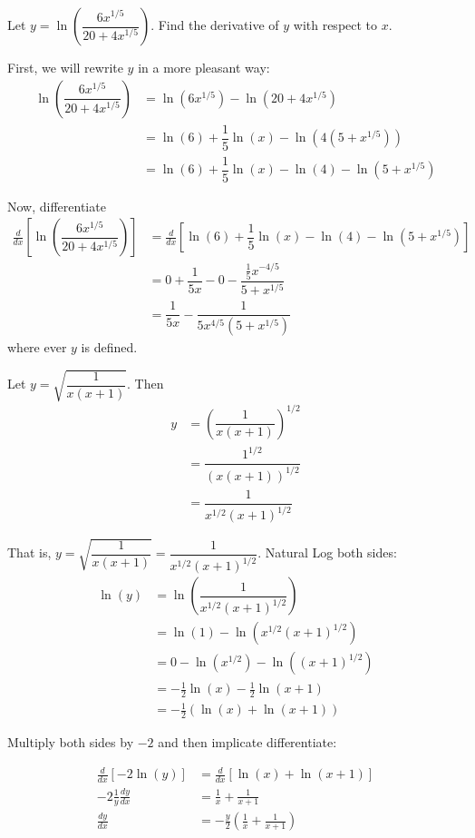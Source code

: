 \documentclass{article}
\newcommand{\ddx}[1]{\frac{d}{dx}\left[#1\right]}
\newcommand{\dydx}{\frac{dy}{dx}}
\newcommand{\newp}{\hrulefill \vskip 1cm}
\begin{document}
Let $y=\ln\left(\dfrac{6x^{1/5}}{20+4x^{1/5}}\right)$. Find the derivative
of $y$ with respect to $x$.

First, we will rewrite $y$ in a more pleasant way:
\[
\begin{aligned}\ln\left(\dfrac{6x^{1/5}}{20+4x^{1/5}}\right) & =\ln(6x^{1/5})-\ln(20+4x^{1/5})\\
 & =\ln(6)+\dfrac{1}{5}\ln(x)-\ln(4(5+x^{1/5}))\\
 & =\ln(6)+\dfrac{1}{5}\ln(x)-\ln(4)-\ln(5+x^{1/5})
\end{aligned}
\]

Now, differentiate
\[
\begin{aligned}\frac{d}{dx}\left[\ln\left(\dfrac{6x^{1/5}}{20+4x^{1/5}}\right)\right] & =\frac{d}{dx}\left[\ln(6)+\dfrac{1}{5}\ln(x)-\ln(4)-\ln(5+x^{1/5})\right]\\
 & =0+\dfrac{1}{5x}-0-\dfrac{\frac{1}{5}x^{-4/5}}{5+x^{1/5}}\\
 & =\dfrac{1}{5x}-\dfrac{1}{5x^{4/5}\left(5+x^{1/5}\right)}
\end{aligned}
\]
where ever $y$ is defined.

\newp

Let $y=\sqrt{\dfrac{1}{x(x+1)}}$. Then
\[
\begin{aligned}
    y&=\left( \dfrac{1}{x(x+1)} \right)^{1/2}\\
    &= \dfrac{1^{1/2}}{\left( x(x+1) \right)^{1/2}}\\
    &= \dfrac{1}{x^{1/2}(x+1)^{1/2}}
\end{aligned}
\]

That is, $y=\sqrt{\dfrac{1}{x(x+1)}}=\dfrac{1}{x^{1/2}(x+1)^{1/2}}$. Natural Log both sides:
\[
\begin{aligned}
    \ln(y)&=\ln\left( \dfrac{1}{x^{1/2}(x+1)^{1/2}} \right)\\
    &=\ln(1)-\ln\left( x^{1/2}(x+1)^{1/2} \right)\\
    &=0-\ln(x^{1/2})-\ln((x+1)^{1/2})\\
    &=-\frac12 \ln(x)-\frac12 \ln(x+1)\\
    &=-\frac12\left(\ln(x)+\ln(x+1)\right)
\end{aligned}
\]

Multiply both sides by $-2$ and then implicate differentiate:

\[
\begin{aligned}
    \ddx{-2\ln(y)}&=\ddx{\ln(x)+\ln(x+1)}\\
    -2\frac{1}{y}\dydx &=\frac{1}{x}+\frac{1}{x+1}\\
    \dydx&=-\frac{y}{2}\left( \frac{1}{x}+\frac{1}{x+1} \right)
\end{aligned}
\]
\end{document}
